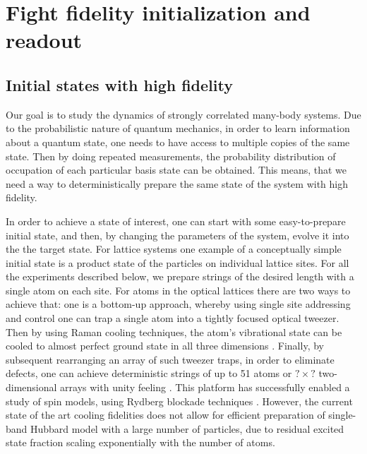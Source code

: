 \chapter{Fight fidelity initialization and readout}

\section{Initial states with high fidelity}

Our goal is to study the dynamics of strongly correlated many-body systems. Due to the probabilistic nature of quantum mechanics, in order to learn information about a quantum state, one needs to have access to multiple copies of the same state. Then by doing repeated measurements, the probability distribution of occupation of each particular basis state can be obtained. This means, that we need a way to deterministically prepare the same state of the system with high fidelity. 

In order to achieve a state of interest, one can start with some easy-to-prepare initial state, and then, by changing the parameters of the system, evolve it into the the target state. For lattice systems one example of a conceptually simple initial state is a product state of the particles on individual lattice sites. For all the experiments described below, we prepare strings of the desired length with a single atom on each site. For atoms in the optical lattices there are two ways to achieve that: one is a bottom-up approach, whereby using single site addressing and control one can trap a single atom into a tightly focused optical tweezer. Then by using Raman cooling techniques, the atom's vibrational state can be cooled to almost perfect ground state in all three dimensions \cite{adamo, selim}. Finally, by subsequent rearranging an array of such tweezer traps, in order to eliminate defects, one can achieve deterministic strings of up to 51 atoms \cite{misha} or $?\times?$ two-dimensional arrays with unity feeling \cite{broweys}. This platform has successfully enabled a study of spin models, using Rydberg blockade techniques \cite{misha}. However, the current state of the art cooling fidelities does not allow for efficient preparation of single-band Hubbard model with a large number of particles, due to residual excited state fraction scaling exponentially with the number of atoms.

